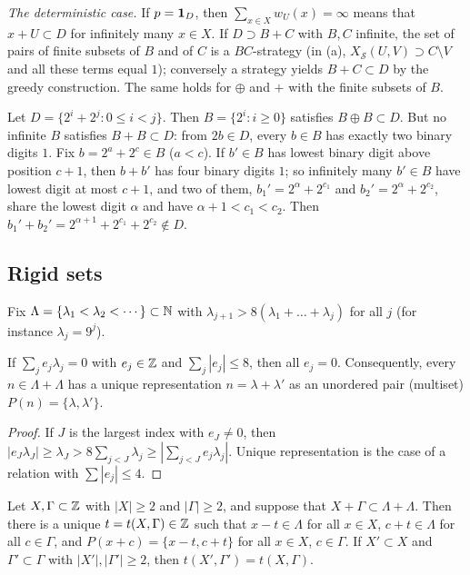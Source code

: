 \emph{The deterministic case.} If $p=\mathbf{1}_D$, then $\sum_{x\in X}w_U(x)=\infty$ means that
$x+U\subset D$ for infinitely many $x\in X$. If $D\supset B+C$ with $B,C$ infinite, the
set of pairs of finite subsets of $B$ and of $C$ is a $BC$-strategy (in (a),
$X_{\mathcal S}(U,V)\supset C\setminus V$ and all these terms equal $1$); conversely a strategy
yields $B+C\subset D$ by the greedy construction. The same holds for $\oplus$ and $+$
with the finite subsets of $B$.

\begin{example}
\label{IB:ex:oplus}
Let $D=\{2^i+2^j:0\le i<j\}$. Then $B=\{2^i:i\ge0\}$ satisfies $B\oplus B\subset D$. But no
infinite $B$ satisfies $B+B\subset D$: from $2b\in D$, every $b\in B$ has exactly two
binary digits $1$. Fix $b=2^a+2^c\in B$ ($a<c$). If $b'\in B$ has lowest binary digit
above position $c+1$, then $b+b'$ has four binary digits $1$; so infinitely many
$b'\in B$ have lowest digit at most $c+1$, and two of them,
$b_1'=2^\alpha+2^{c_1}$ and $b_2'=2^\alpha+2^{c_2}$, share the lowest digit $\alpha$ and have
$\alpha+1<c_1<c_2$. Then $b_1'+b_2'=2^{\alpha+1}+2^{c_1}+2^{c_2}\notin D$.
\end{example}

\subsection{Rigid sets}

Fix $\Lambda=\{\lambda_1<\lambda_2<\cdots\}\subset\mathbb{N}$ with $\lambda_{j+1}>8(\lambda_1+\dots+\lambda_j)$ for all $j$ (for
instance $\lambda_j=9^j$).

\begin{lemma}
\label{IB:lem:rigid}
If $\sum_je_j\lambda_j=0$ with $e_j\in\mathbb{Z}$ and $\sum_j|e_j|\le8$, then all $e_j=0$. Consequently,
every $n\in\Lambda+\Lambda$ has a unique representation $n=\lambda+\lambda'$ as an unordered pair
(multiset) $P(n)=\{\lambda,\lambda'\}$.
\end{lemma}

\begin{proof}
If $J$ is the largest index with $e_J\ne0$, then
$|e_J\lambda_J|\ge\lambda_J>8\sum_{j<J}\lambda_j\ge|\sum_{j<J}e_j\lambda_j|$. Unique representation is
the case of a relation with $\sum|e_j|\le4$.
\end{proof}

\begin{lemma}
\label{IB:lem:R}
Let $X,\Gamma\subset\mathbb{Z}$ with $|X|\ge2$ and $|\Gamma|\ge2$, and suppose that $X+\Gamma\subset\Lambda+\Lambda$. Then
there is a unique $t=t(X,\Gamma)\in\mathbb{Z}$ such that $x-t\in\Lambda$ for all $x\in X$, $c+t\in\Lambda$ for all
$c\in\Gamma$, and $P(x+c)=\{x-t,c+t\}$ for all $x\in X$, $c\in\Gamma$. If $X'\subset X$ and
$\Gamma'\subset\Gamma$ with $|X'|,|\Gamma'|\ge2$, then $t(X',\Gamma')=t(X,\Gamma)$.
\end{lemma}

